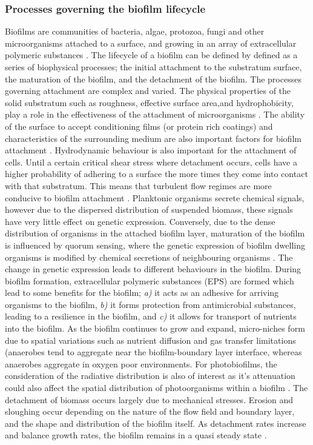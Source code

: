 \subsubsection{Processes governing the biofilm lifecycle} 
Biofilms are communities of bacteria, algae, protozoa, fungi and other microorganisms attached to a surface, and growing in an array of extracellular polymeric substances \cite{vanloosdrecht2002}.
The lifecycle of a biofilm can be defined by defined as a series of biophysical processes; the initial attachment to the substratum surface, the maturation of the biofilm, and the detachment of the biofilm. The processes governing attachment are complex and varied. The physical properties of the solid substratum such as roughness, effective surface area,and hydrophobicity, play a role in the effectiveness of the attachment of microorganisms \cite{marshall1990}. The ability of the surface to accept conditioning films (or protein rich coatings) and characteristics of the surrounding medium are also important factors for biofilm attachment \cite{donlan2002}. Hydrodynamic behaviour is also important for the attachment of cells. Until a certain critical shear stress where detachment occurs, cells have a higher probability of adhering to a surface the more times they come into contact with that substratum. This means that turbulent flow regimes are more conducive to biofilm attachment \cite{rijnaarts1993}.
\skippingparagraph
Planktonic organisms secrete chemical signals, however due to the dispersed distribution of suspended biomass, these signals have very little effect on genetic expression. Conversely, due to the dense distribution of organisms in the attached biofilm layer, maturation of the biofilm is influenced by quorum sensing, where the genetic expression of biofilm dwelling organisms is modified by chemical secretions of neighbouring organisms \cite{donlan2002}. The change in genetic expression leads to different behaviours in the biofilm. During biofilm formation, extracellular polymeric substances (EPS) are formed which lead to some benefits for the biofilm; \textit{a)} it acts as an adhesive for arriving organisms to the biofilm, \textit{b)} it forms protection from antimicrobial substances, leading to a resilience in the biofilm, and \textit{c)} it allows for transport of nutrients into the biofilm. As the biofilm continues to grow and expand, micro-niches form due to spatial variations such as nutrient diffusion and gas transfer limitations (anaerobes tend to aggregate near the biofilm-boundary layer interface, whereas anaerobes aggregate in oxygen poor environments. For photobiofilms, the consideration of the radiative distribution is also of interest as it's attenuation could also affect the spatial distribution of photoorganisms within a biofilm \cite{podola2017}.
\skippingparagraph
The detachment of biomass occurs largely due to mechanical stresses. Erosion and sloughing occur depending on the nature of the flow field and boundary layer, and the shape and distribution of the biofilm itself. As detachment rates increase and balance growth rates, the biofilm remains in a quasi steady state \cite{Xavier2005, Storck2015}.

